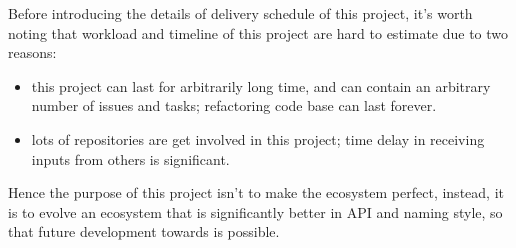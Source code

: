 Before introducing the details of delivery schedule of this project, it's worth noting that workload and timeline of this project are hard to estimate due to two reasons:
{\normalsize
\begin{itemize}
    \item this project can last for arbitrarily long time, and can contain an arbitrary number of issues and tasks; refactoring code base can last forever.
    \item lots of repositories are get involved in this project; time delay in receiving inputs from others is significant.
\end{itemize}
}
Hence the purpose of this project isn't to make the ecosystem perfect, instead, it is to evolve an ecosystem that is significantly better in API and naming style, so that future development towards \images{}  is possible.
